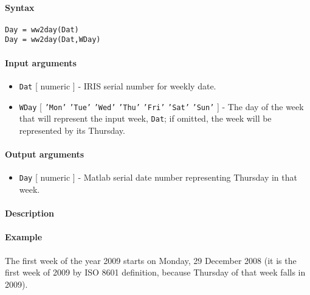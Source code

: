 


	\paragraph{Syntax}

\begin{verbatim}
Day = ww2day(Dat)
Day = ww2day(Dat,WDay)
\end{verbatim}

\paragraph{Input arguments}

\begin{itemize}
\item
  \texttt{Dat} {[} numeric {]} - IRIS serial number for weekly date.
\item
  \texttt{WDay} {[} \texttt{'Mon'} \textbar{} \texttt{'Tue'} \textbar{}
  \texttt{'Wed'} \textbar{} \texttt{'Thu'} \textbar{} \texttt{'Fri'}
  \textbar{} \texttt{'Sat'} \textbar{} \texttt{'Sun'} {]} - The day of
  the week that will represent the input week, \texttt{Dat}; if omitted,
  the week will be represented by its Thursday.
\end{itemize}

\paragraph{Output arguments}

\begin{itemize}
\itemsep1pt\parskip0pt
\item
  \texttt{Day} {[} numeric {]} - Matlab serial date number representing
  Thursday in that week.
\end{itemize}

\paragraph{Description}

\paragraph{Example}

The first week of the year 2009 starts on Monday, 29 December 2008 (it
is the first week of 2009 by ISO 8601 definition, because Thursday of
that week falls in 2009).

